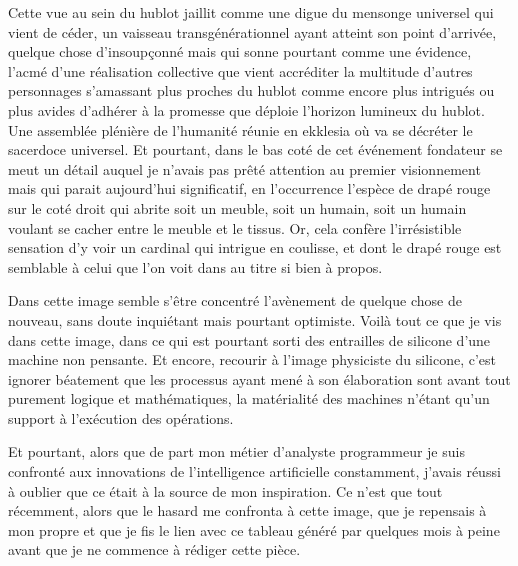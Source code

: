 Cette vue au sein du hublot jaillit comme une digue du mensonge universel qui vient de céder, un vaisseau transgénérationnel ayant atteint son point d’arrivée, quelque chose d’insoupçonné mais qui sonne pourtant comme une évidence, l’acmé d’une réalisation collective que vient accréditer la multitude d’autres personnages s’amassant plus proches du hublot comme encore plus intrigués ou plus avides d’adhérer à la promesse que déploie l’horizon lumineux du hublot. Une assemblée plénière de l’humanité réunie en ekklesia où va se décréter le sacerdoce universel.
Et pourtant, dans le bas coté de cet événement fondateur
se meut un détail auquel je n’avais pas prêté attention au premier visionnement mais qui parait aujourd’hui significatif, en l’occurrence l’espèce de drapé rouge sur le coté droit qui abrite soit un meuble, soit un humain, soit un humain voulant se cacher entre le meuble et le tissus. Or, cela confère l’irrésistible sensation d’y voir un cardinal qui intrigue en coulisse, et dont le drapé rouge est semblable à celui que l’on voit dans  au titre si bien à propos.

Dans cette image semble s’être concentré l’avènement de quelque chose de nouveau, sans doute inquiétant mais pourtant optimiste. Voilà tout ce que je vis dans cette image, dans ce  qui est pourtant sorti des entrailles de silicone d’une machine non pensante. Et encore, recourir à l’image physiciste du silicone, c’est ignorer béatement que les processus ayant mené à son élaboration sont avant tout purement logique et mathématiques, la matérialité des machines n’étant qu’un support à l’exécution des opérations.


Et pourtant, alors que de part mon métier d’analyste programmeur je suis confronté aux innovations de l’intelligence artificielle constamment, j’avais réussi à oublier que ce  était à la source de mon inspiration. Ce n’est que tout récemment, alors que le hasard me confronta à cette image, que je repensais à mon propre  et que je fis le lien avec ce tableau généré par  quelques mois à peine avant que je ne commence à rédiger cette pièce.
